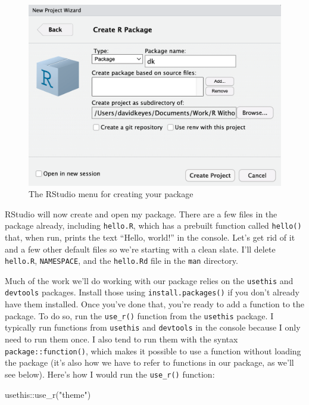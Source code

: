 \documentclass[
]{book}
\newenvironment{Shaded}{\begin{snugshade}}{\end{snugshade}}
\newcommand{\FunctionTok}[1]{\textcolor[rgb]{0.00,0.00,0.00}{#1}}
\newcommand{\NormalTok}[1]{#1}
\newcommand{\SpecialCharTok}[1]{\textcolor[rgb]{0.00,0.00,0.00}{#1}}
\newcommand{\StringTok}[1]{\textcolor[rgb]{0.31,0.60,0.02}{#1}}
\begin{document}
\begin{figure}
\includegraphics[width=1\linewidth]{assets/create-r-package} \caption{The RStudio menu for creating your package}\label{fig:rstudio-create-package}
\end{figure}

RStudio will now create and open my package. There are a few files in the package already, including \texttt{hello.R}, which has a prebuilt function called \texttt{hello()} that, when run, prints the text ``Hello, world!'' in the console. Let's get rid of it and a few other default files so we're starting with a clean slate. I'll delete \texttt{hello.R}, \texttt{NAMESPACE}, and the \texttt{hello.Rd} file in the \texttt{man} directory.

Much of the work we'll do working with our package relies on the \texttt{usethis} and \texttt{devtools} packages. Install those using \texttt{install.packages()} if you don't already have them installed. Once you've done that, you're ready to add a function to the package. To do so, run the \texttt{use\_r()} function from the \texttt{usethis} package. I typically run functions from \texttt{usethis} and \texttt{devtools} in the console because I only need to run them once. I also tend to run them with the syntax \texttt{package::function()}, which makes it possible to use a function without loading the package (it's also how we have to refer to functions in our package, as we'll see below). Here's how I would run the \texttt{use\_r()} function:

\begin{Shaded}
\begin{Highlighting}[]
\NormalTok{usethis}\SpecialCharTok{::}\FunctionTok{use\_r}\NormalTok{(}\StringTok{"theme"}\NormalTok{)}
\end{Highlighting}
\end{Shaded}
\end{document}
